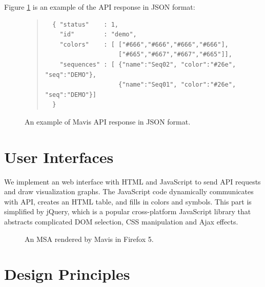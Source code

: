 Figure \ref{fig:api-res} is an example of the API response in JSON format:
\begin{figure}[hb]
\begin{quote}
\begin{verbatim}
  { "status"    : 1,
    "id"        : "demo",
    "colors"    : [ ["#666","#666","#666","#666"],
                    ["#665","#667","#667","#665"]],
    "sequences" : [ {"name":"Seq02", "color":"#26e", "seq":"DEMO"},
                    {"name":"Seq01", "color":"#26e", "seq":"DEMO"}]
  }
\end{verbatim}
\end{quote}
\caption[Example of API Response in JSON Format]{An example of Mavis API response in JSON format.}\label{fig:api-res}
\end{figure}

\section{User Interfaces}

We implement an web interface with HTML and JavaScript to send API requests and draw visualization graphs. The JavaScript code dynamically communicates with API, creates an HTML table, and fills in colors and symbols. This part is simplified by jQuery, which is a popular cross-platform JavaScript library that abstracts complicated DOM selection, CSS manipulation and Ajax effects.

\begin{landscape}
\begin{figure}[p]
\caption[MSA Rendered by Mavis in Web Browser]{An MSA rendered by Mavis in Firefox 5.}\label{fig:chap4_mavis}
\end{figure}
\end{landscape}

\section{Design Principles}